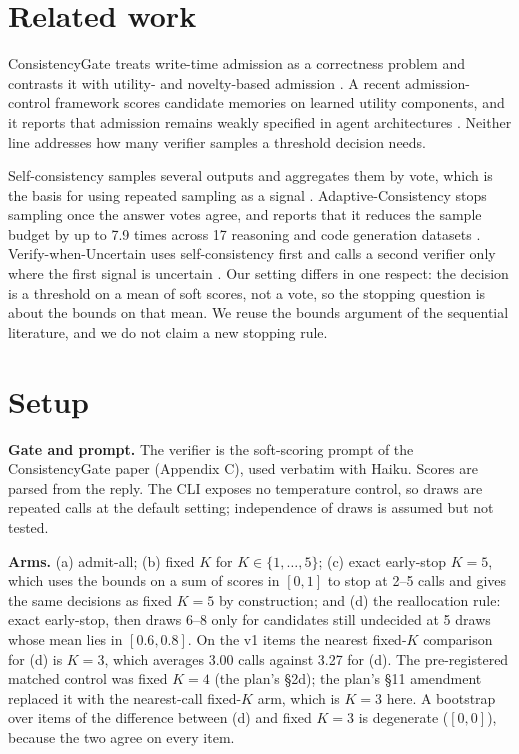 \documentclass[11pt]{article}
\begin{document}
\section{Related work}
ConsistencyGate treats write-time admission as a correctness problem and contrasts it with utility- and novelty-based admission \citep{consistencygate}. A recent admission-control framework scores candidate memories on learned utility components, and it reports that admission remains weakly specified in agent architectures \citep{amac}. Neither line addresses how many verifier samples a threshold decision needs.

Self-consistency samples several outputs and aggregates them by vote, which is the basis for using repeated sampling as a signal \citep{selfconsistency}. Adaptive-Consistency stops sampling once the answer votes agree, and reports that it reduces the sample budget by up to 7.9 times across 17 reasoning and code generation datasets \citep{adaptiveconsistency}. Verify-when-Uncertain uses self-consistency first and calls a second verifier only where the first signal is uncertain \citep{verifywhenuncertain}. Our setting differs in one respect: the decision is a threshold on a mean of soft scores, not a vote, so the stopping question is about the bounds on that mean. We reuse the bounds argument of the sequential literature, and we do not claim a new stopping rule.

\section{Setup}
\textbf{Gate and prompt.} The verifier is the soft-scoring prompt of the ConsistencyGate paper (Appendix C), used verbatim with Haiku. Scores are parsed from the reply. The CLI exposes no temperature control, so draws are repeated calls at the default setting; independence of draws is assumed but not tested.

\textbf{Arms.} (a) admit-all; (b) fixed $K$ for $K\in\{1,\dots,5\}$; (c) exact early-stop $K{=}5$, which uses the bounds on a sum of scores in $[0,1]$ to stop at 2--5 calls and gives the same decisions as fixed $K{=}5$ by construction; and (d) the reallocation rule: exact early-stop, then draws 6--8 only for candidates still undecided at 5 draws whose mean lies in $[0.6,0.8]$. On the v1 items the nearest fixed-$K$ comparison for (d) is $K{=}3$, which averages 3.00 calls against 3.27 for (d). The pre-registered matched control was fixed $K{=}4$ (the plan's §2d); the plan's §11 amendment replaced it with the nearest-call fixed-$K$ arm, which is $K{=}3$ here. A bootstrap over items of the difference between (d) and fixed $K{=}3$ is degenerate ($[0,0]$), because the two agree on every item.
\end{document}
